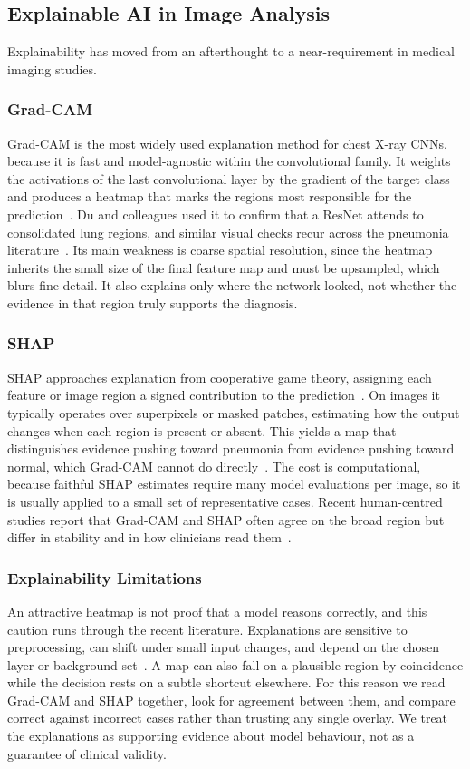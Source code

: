 \documentclass[preprint,12pt]{elsarticle}
\begin{document}
\subsection{Explainable AI in Image Analysis}
Explainability has moved from an afterthought to a near-requirement in medical imaging studies.

\subsubsection{Grad-CAM}
Grad-CAM is the most widely used explanation method for chest X-ray CNNs, because it is fast and model-agnostic within the convolutional family.
It weights the activations of the last convolutional layer by the gradient of the target class and produces a heatmap that marks the regions most responsible for the prediction~\cite{selvaraju2017gradcam}.
Du and colleagues used it to confirm that a ResNet attends to consolidated lung regions, and similar visual checks recur across the pneumonia literature~\cite{du2023classification,colin2025interpretable}.
Its main weakness is coarse spatial resolution, since the heatmap inherits the small size of the final feature map and must be upsampled, which blurs fine detail.
It also explains only where the network looked, not whether the evidence in that region truly supports the diagnosis.

\subsubsection{SHAP}
SHAP approaches explanation from cooperative game theory, assigning each feature or image region a signed contribution to the prediction~\cite{lundberg2017unified}.
On images it typically operates over superpixels or masked patches, estimating how the output changes when each region is present or absent.
This yields a map that distinguishes evidence pushing toward pneumonia from evidence pushing toward normal, which Grad-CAM cannot do directly~\cite{mahamud2024explainable}.
The cost is computational, because faithful SHAP estimates require many model evaluations per image, so it is usually applied to a small set of representative cases.
Recent human-centred studies report that Grad-CAM and SHAP often agree on the broad region but differ in stability and in how clinicians read them~\cite{bhatia2024evaluating,iqbal2024ensemblecam}.

\subsubsection{Explainability Limitations}
An attractive heatmap is not proof that a model reasons correctly, and this caution runs through the recent literature.
Explanations are sensitive to preprocessing, can shift under small input changes, and depend on the chosen layer or background set~\cite{bhatia2024evaluating}.
A map can also fall on a plausible region by coincidence while the decision rests on a subtle shortcut elsewhere.
For this reason we read Grad-CAM and SHAP together, look for agreement between them, and compare correct against incorrect cases rather than trusting any single overlay.
We treat the explanations as supporting evidence about model behaviour, not as a guarantee of clinical validity.
\end{document}
